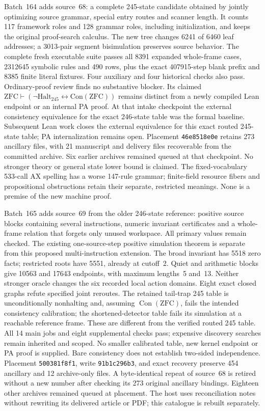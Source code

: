 \documentclass[11pt]{article}
\begin{document}
{Batch~164 adds source~68: a complete 245-state candidate obtained by jointly
optimizing source grammar, special entry routes and scanner length. It counts
117 framework roles and 128 grammar roles, including initialization, and keeps
the original proof-search calculus. The new tree changes 6241 of 6460 leaf
addresses; a 3013-pair segment bisimulation preserves source behavior.
The complete fresh executable suite passes all 8391 expanded whole-frame cases,
2312645 symbolic rules and 490 rows, plus the exact 407915-step blank prefix and
8385 finite literal fixtures. Four auxiliary and four historical checks also
pass. Ordinary-proof review finds no substantive blocker. Its claimed
$\mathrm{ZFC}\vdash(\neg\mathrm{Halt}_{245}\leftrightarrow\mathrm{Con}(\mathrm{ZFC}))$
remains distinct from a newly compiled Lean endpoint or an internal PA proof.
At that intake checkpoint the external consistency equivalence for the exact
246-state table was the formal baseline. Subsequent Lean work closes the
external equivalence for this exact routed 245-state table; PA internalization
remains open.
Placement \texttt{46e8518e0e} retains 273 ancillary files, with 21 manuscript and
delivery files recoverable from the committed archive. Six earlier archives
remained queued at that checkpoint. No stronger theory or general state lower bound is
claimed. The fixed-vocabulary 533-call AX spelling has a worse 147-rule grammar;
finite-field resource fibers and propositional obstructions retain their
separate, restricted meanings. None is a premise of the new machine proof.

Batch~165 adds source~69 from the older 246-state reference: positive source
blocks containing several instructions, numeric invariant certificates and a
whole-frame relation that forgets only unused workspace. All primary values
remain checked. The existing one-source-step positive simulation theorem is
separate from this proposed multi-instruction extension. The broad invariant
has 5518 zero facts; restricted roots have 5551, already at cutoff~2. Quiet and
arithmetic blocks give 10563 and 17643 endpoints, with maximum lengths~5 and~13.
Neither stronger oracle changes the six recorded local action domains.
Eight exact closed graphs refute specified joint reroutes. The retained tail-trap
245 table is unconditionally nonhalting and, assuming $\operatorname{Con}(\mathrm{ZFC})$,
fails the intended consistency calibration; the shortened-detector table fails
its simulation at a reachable reference frame.
These are different from the verified routed 245 table. All 14 main jobs and
eight supplemental checks pass; expensive discovery searches remain inherited
and scoped. No smaller calibrated table, new kernel endpoint or PA proof is
supplied. Bare consistency does not establish two-sided independence.
Placement \texttt{500381f8f1}, write \texttt{91b1c296b3}, and exact recovery preserve
454 ancillary and 12 archive-only files. A byte-identical repeat of source~68
is retired without a new number after checking its 273 original ancillary
bindings. Eighteen other archives remained queued at placement. The host uses reconciliation
notes without rewriting its delivered article or PDF; this catalogue is rebuilt
separately.

}
\end{document}
